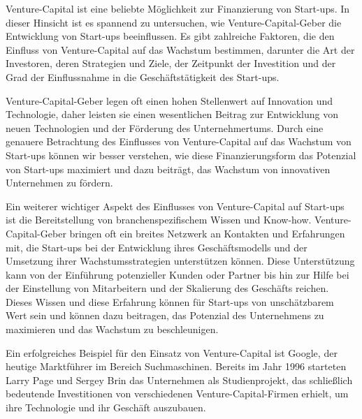 \begin{refsection}
  
Venture-Capital ist eine beliebte Möglichkeit zur Finanzierung von Start-ups. In dieser Hinsicht ist es spannend zu untersuchen, wie Venture-Capital-Geber die Entwicklung von Start-ups beeinflussen. Es gibt zahlreiche Faktoren, die den Einfluss von Venture-Capital auf das Wachstum bestimmen, darunter die Art der Investoren, deren Strategien und Ziele, der Zeitpunkt der Investition und der Grad der Einflussnahme in die Geschäftstätigkeit des Start-ups.

Venture-Capital-Geber legen oft einen hohen Stellenwert auf Innovation und Technologie, daher leisten sie einen wesentlichen Beitrag zur Entwicklung von neuen Technologien und der Förderung des Unternehmertums. Durch eine genauere Betrachtung des Einflusses von Venture-Capital auf das Wachstum von Start-ups können wir besser verstehen, wie diese Finanzierungsform das Potenzial von Start-ups maximiert und dazu beiträgt, das Wachstum von innovativen Unternehmen zu fördern.

Ein weiterer wichtiger Aspekt des Einflusses von Venture-Capital auf Start-ups ist die Bereitstellung von branchenspezifischem Wissen und Know-how. Venture-Capital-Geber bringen oft ein breites Netzwerk an Kontakten und Erfahrungen mit, die Start-ups bei der Entwicklung ihres Geschäftsmodells und der Umsetzung ihrer Wachstumsstrategien unterstützen können. Diese Unterstützung kann von der Einführung potenzieller Kunden oder Partner bis hin zur Hilfe bei der Einstellung von Mitarbeitern und der Skalierung des Geschäfts reichen. Dieses Wissen und diese Erfahrung können für Start-ups von unschätzbarem Wert sein und können dazu beitragen, das Potenzial des Unternehmens zu maximieren und das Wachstum zu beschleunigen.

Ein erfolgreiches Beispiel für den Einsatz von Venture-Capital ist Google, der heutige Marktführer im Bereich Suchmaschinen. Bereits im Jahr 1996 starteten Larry Page und Sergey Brin das Unternehmen als Studienprojekt, das schließlich bedeutende Investitionen von verschiedenen Venture-Capital-Firmen erhielt, um ihre Technologie und ihr Geschäft auszubauen. \autocite{Gerginov2020}

  \clearpage
  \printbibliography[heading=subsubbibliography]
\end{refsection}
\clearpage
